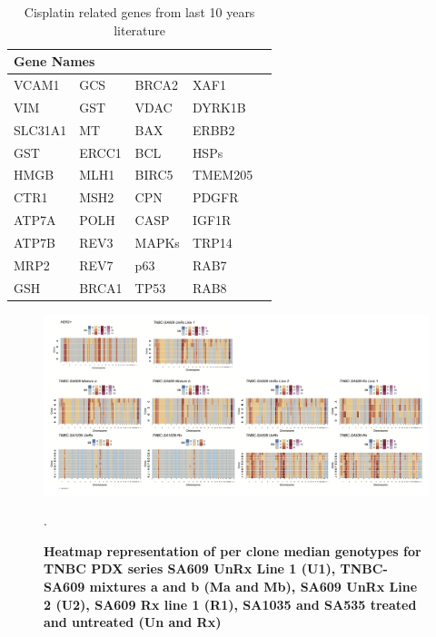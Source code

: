  \begin{table}[htbp]
   \centering
   \caption{Cisplatin related genes from last 10 years literature}
     \begin{tabular}{|l|l|l|l|r}
     
     \hline
     \multicolumn{4}{|l|}{Gene Names}  \\
     \hline
     
     VCAM1  & GCS    & BRCA2  & XAF1    \\
     VIM    & GST    & VDAC   & DYRK1B  \\
     SLC31A1 & MT     & BAX    & ERBB2 \\
     GST    & ERCC1  & BCL    & HSPs   \\
     HMGB   & MLH1   & BIRC5  & TMEM205 \\
     CTR1   & MSH2   & CPN    & PDGFR \\
     ATP7A  & POLH   & CASP   & IGF1R  \\
     ATP7B  & REV3   & MAPKs  & TRP14  \\
     MRP2   & REV7   & p63    & RAB7   \\
     GSH    & BRCA1  & TP53   & RAB8   \\
     \hline
     \end{tabular}%
   \label{tab:Cisplatinrelatedgenes}%
 \end{table}
\begin{figure}
\centering
  \includegraphics[width=\textwidth]{Figures/chap4/mediangenotypespdx.png}
\caption[Heatmaps of median genotypes]
	{\small
	\textbf{Heatmap representation of per clone median genotypes for TNBC PDX series SA609 UnRx Line 1 (U1), TNBC-SA609 mixtures a and b (Ma and Mb), SA609 UnRx Line 2 (U2), SA609 Rx line 1 (R1), SA1035 and SA535 treated and untreated (Un and Rx)}}.
	  
	 	\label{fig:mediangenotypes}
\end{figure} 


